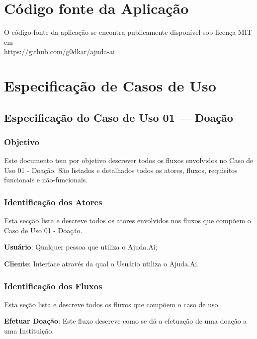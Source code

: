 \begin{anexosenv}


\chapter{Código fonte da Aplicação} \label{anexo:a}
O código-fonte da aplicação se encontra publicamente disponível sob licença MIT em \\
https://github.com/g0dkar/ajuda-ai


\chapter{Especificação de Casos de Uso} \label{anexo:b}

\section*{Especificação do Caso de Uso 01 --- Doação}
\subsection*{Objetivo}
Este documento tem por objetivo descrever todos os fluxos envolvidos no Caso de Uso 01 - Doação. São listados e detalhados todos os atores, fluxos, requisitos funcionais e não-funcionais.

\subsection*{Identificação dos Atores}
Esta secção lista e descreve todos os atores envolvidos nos fluxos que compõem o Caso de Uso 01 - Doação.
\begin{lista}
  \item \textbf{Usuário}: Qualquer pessoa que utiliza o Ajuda.Ai;
  \item \textbf{Cliente}: Interface através da qual o Usuário utiliza o Ajuda.Ai.
\end{lista}

\subsection*{Identificação dos Fluxos}
Esta seção lista e descreve todos os fluxos que compõem o caso de uso.
\begin{lista}
  \item \textbf{Efetuar Doação}: Este fluxo descreve como se dá a efetuação de uma doação a uma Instituição.
\end{lista}


\end{anexosenv}
